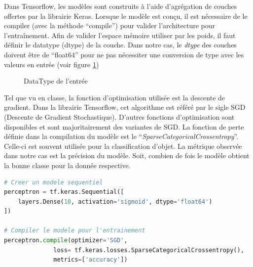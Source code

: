 \documentclass{article}
\begin{document}
\medbreak
Dans Tensorflow, les modèles sont construits à l'aide d'agrégation de couches offertes par la librairie Keras. Lorsque le modèle est conçu, il est nécessaire de le compiler (avec la méthode ``compile'') pour valider l'architecture pour l'entraînement. Afin de valider l'espace mémoire utiliser par les poids, il faut définir le datatype (dtype) de la couche. Dans notre cas, le \textit{dtype} des couches doivent être de ``float64'' pour ne pas nécessiter une conversion de type avec les valeurs en entrée (voir figure \ref{fig:zoom_result_info_ds})
\medbreak

\begin{figure}[H]
  \centering
  \caption{DataType de l'entrée}
  \label{fig:zoom_result_info_ds}
\end{figure}

Tel que vu en classe, la fonction d'optimisation utilisée est la descente de gradient. Dans la librairie Tensorflow, cet algorithme est référé par le sigle SGD (Descente de Gradient Stochastique). D'autres fonctions d'optimisation sont disponibles et sont majoritairement des variantes de SGD. La fonction de perte définie dans la compilation du modèle est le ``\textit{SparseCategoricalCrossentropy}''. Celle-ci est souvent utilisée pour la classification d'objet. La métrique observée dans notre cas est la précision du modèle. Soit, combien de fois le modèle obtient la bonne classe pour la donnée respective.
\medbreak
\begin{lstlisting}[language=Python, caption={Fonction pour l'entraînement du modèle}, label={code:create_perceptron}]
# Creer un modele sequentiel
perceptron = tf.keras.Sequential([
    layers.Dense(10, activation='sigmoid', dtype='float64')
])

# Compiler le modele pour l'entrainement
perceptron.compile(optimizer='SGD',
              loss= tf.keras.losses.SparseCategoricalCrossentropy(),
              metrics=['accuracy'])
\end{lstlisting}
\end{document}
